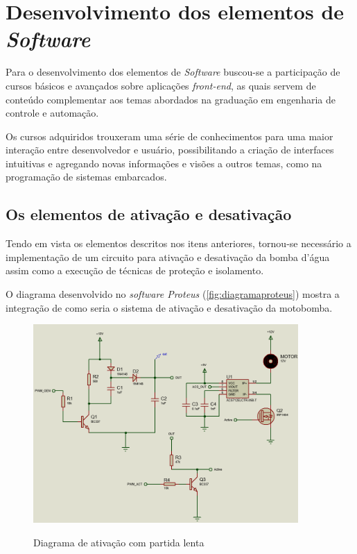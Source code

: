 \section{Desenvolvimento dos elementos de \textit{Software}}

Para o desenvolvimento dos elementos de \textit{Software} buscou-se a participação de cursos básicos e avançados sobre aplicações \textit{front-end}, as quais servem de conteúdo complementar aos temas abordados na graduação em engenharia de controle e automação.

Os cursos adquiridos trouxeram uma série de conhecimentos para uma maior interação entre desenvolvedor e usuário, possibilitando a criação de interfaces intuitivas e agregando novas informações e visões a outros temas, como na programação de sistemas embarcados.

\subsection{Os elementos de ativação e desativação}

Tendo em vista os elementos descritos nos itens anteriores, tornou-se necessário a implementação de um circuito para ativação e desativação da bomba d'água assim como a execução de técnicas de proteção e isolamento.

O diagrama desenvolvido no \textit{software Proteus} (\autoref{fig:diagramaproteus}) mostra a integração de como seria o sistema de ativação e desativação da motobomba.

\begin{figure}[H]
	\centering
	\caption{Diagrama de ativação com partida lenta}
	\includegraphics[width=0.9\textwidth]{figuras/diagrama_ativação_bomba.png}
	\label{fig:diagramaproteus}
\end{figure} 

